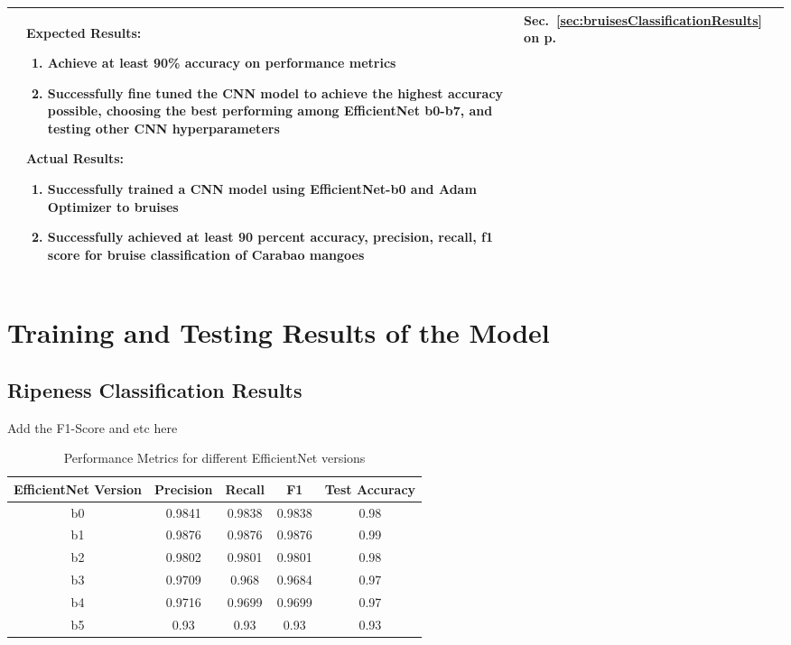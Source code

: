 \begin{center}
{\begin{tabularx}{\textwidth}{p{}|p{}|p{}}
			\Paste{SO7} & 
			Expected Results:
			\begin{enumerate}
				\item Achieve at least 90\% accuracy on performance metrics
				\item Successfully fine tuned the CNN model to achieve the highest accuracy possible, choosing the best performing among EfficientNet b0-b7, and testing other CNN hyperparameters
			\end{enumerate} 
			Actual Results:
			\begin{enumerate}
				\item Successfully trained a CNN model using EfficientNet-b0 and Adam Optimizer to bruises 
				\item Successfully achieved at least 90 percent accuracy, precision, recall, f1 score for bruise classification of Carabao mangoes
			\end{enumerate}
			 & Sec.~\ref{sec:bruisesClassificationResults} on p.~\pageref{sec:bruisesClassificationResults} \\ \hline
			
		\end{tabularx}
	}
\end{center}

\section{Training and Testing Results of the Model} \label{sec:main_trainAndTestResults}

\subsection{Ripeness Classification Results} \label{sec:ripenessClassificationResults}
Add the \gls{F1-Score} and etc here

\begin{table}[htbp]
	\centering
	\begin{tabular}{c|c|c|c|c}
	  \hline
	  \textbf{EfficientNet Version} & \textbf{Precision} & \textbf{Recall} & \textbf{F1} & \textbf{Test Accuracy} \\
	  \hline
	  b0 & 0.9841 & 0.9838 & 0.9838 & 0.98 \\
	  \hline
	  b1 & 0.9876 & 0.9876 & 0.9876 & 0.99 \\
	  \hline
	  b2 & 0.9802 & 0.9801 & 0.9801 & 0.98 \\
	  \hline
	  b3 & 0.9709 & 0.968 & 0.9684 & 0.97 \\
	  \hline
	  b4 & 0.9716 & 0.9699 & 0.9699 & 0.97 \\
	  \hline
	  b5 & 0.93 & 0.93 & 0.93 & 0.93 \\
	  \hline
	\end{tabular}
	\caption{Performance Metrics for different EfficientNet versions}
	\label{tab:efficientnet_performance}
\end{table}

